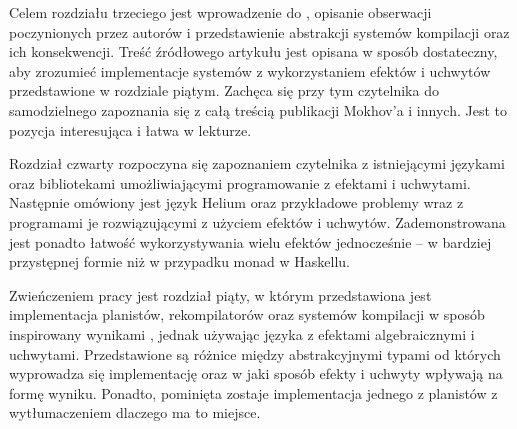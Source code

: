 Celem rozdziału trzeciego jest wprowadzenie do \BSaLC{}, opisanie obserwacji poczynionych przez autorów i przedstawienie abstrakcji systemów kompilacji oraz ich konsekwencji. Treść źródłowego artykułu jest opisana w sposób dostateczny, aby zrozumieć implementacje systemów z wykorzystaniem efektów i uchwytów przedstawione w rozdziale piątym. Zachęca się przy tym czytelnika do samodzielnego zapoznania się z całą treścią publikacji Mokhov'a i innych. Jest to pozycja interesująca i łatwa w lekturze.

Rozdział czwarty rozpoczyna się zapoznaniem czytelnika z istniejącymi językami oraz bibliotekami umożliwiającymi programowanie z efektami i uchwytami. Następnie omówiony jest język Helium oraz przykładowe problemy wraz z programami je rozwiązującymi z użyciem efektów i uchwytów. Zademonstrowana jest ponadto łatwość wykorzystywania wielu efektów jednocześnie -- w bardziej przystępnej formie niż w przypadku monad w Haskellu.

Zwieńczeniem pracy jest rozdział piąty, w którym przedstawiona jest implementacja planistów, rekompilatorów oraz systemów kompilacji w sposób inspirowany wynikami \BSaLC{}, jednak używając języka z efektami algebraicznymi i uchwytami. Przedstawione są różnice między abstrakcyjnymi typami od których wyprowadza się implementację oraz w jaki sposób efekty i uchwyty wpływają na formę wyniku. Ponadto, pominięta zostaje implementacja jednego z planistów z wytłumaczeniem dlaczego ma to miejsce.
